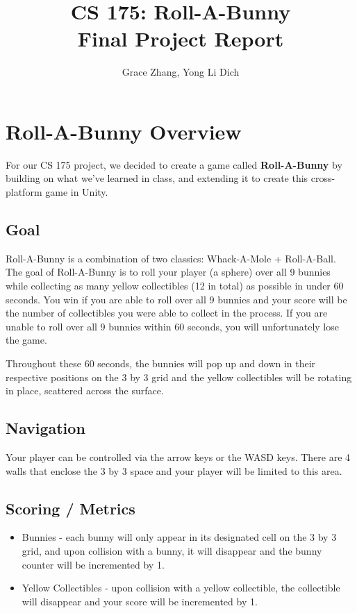 \documentclass[12pt]{article}
\begin{document}
\title{%
  \textbf{CS 175: Roll-A-Bunny \\
  \large Final Project Report}}
\author{Grace Zhang, Yong Li Dich}
\date{}
\maketitle

\newpage
\tableofcontents


\newpage
 
\section{Roll-A-Bunny Overview}
  For our CS 175 project, we decided to create a game called \textbf{Roll-A-Bunny} by building on what we've learned in class, and extending it to create this cross-platform game in Unity.
\subsection{Goal}
  Roll-A-Bunny is a combination of two classics: Whack-A-Mole + Roll-A-Ball. The goal of Roll-A-Bunny is to roll your player (a sphere) over all 9 bunnies while collecting as many yellow collectibles (12 in total) as possible in under 60 seconds. 
  You win if you are able to roll over all 9 bunnies and your score will be the number of collectibles you were able to collect in the process. If you are unable to roll over all 9 bunnies within 60 seconds, you will unfortunately lose the game.

  Throughout these 60 seconds, the bunnies will pop up and down in their respective positions on the 3 by 3 grid and the yellow collectibles will be rotating in place, scattered across the surface. 
  
\subsection{Navigation}
Your player can be controlled via the arrow keys or the WASD keys. 
There are 4 walls that enclose the 3 by 3 space and your player will be limited to this area. 

\subsection{Scoring / Metrics}
\begin{itemize}
  \item Bunnies - each bunny will only appear in its designated cell on the 3 by 3 grid, and upon collision with a bunny, it will disappear and the bunny counter will be incremented by 1. 
  \item Yellow Collectibles - upon collision with a yellow collectible, the collectible will disappear and your score will be incremented by 1.
\end{itemize}
\end{document}
